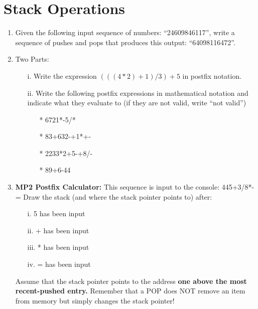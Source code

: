 \documentclass{article}
\begin{document}
\section{Stack Operations}
\begin{enumerate}[label=(\alph*)]
    \item Given the following input sequence of numbers: “24609846117”, write a sequence of pushes and pops that produces this output: “64098116472”.

    \item Two Parts:
    \begin{enumerate}[label=()]
        \item[i.] Write the expression    $(  ( (4 * 2) + 1 ) / 3) + 5$ in postfix notation.
        \item[ii.] Write the following postfix expressions in mathematical notation and indicate what they evaluate to (if they are not valid, write “not valid”)
        \begin{enumerate}
            \item[*] 6721*-5/* \newline
            \item[*] 83+632-+1*+- \newline
            \item[*] 2233*2+5-+8/- \newline
            \item[*] 89+6-44 \newline
        \end{enumerate}
    \end{enumerate}


    \item \textbf{MP2 Postfix Calculator:} This sequence is input to the console: 445+3/8*-= Draw the stack (and where the stack pointer points to) after:

    \begin{enumerate}
        \item[i.] 5 has been input
        \item[ii.] + has been input
        \item[iii.] * has been input
        \item[iv.] = has been input
    \end{enumerate}
    Assume that the stack pointer points to the address \textbf{one above the most recent-pushed entry.} Remember that a POP does NOT remove an item from memory but simply changes the stack pointer!
    \newpage
 
\end{enumerate}
\end{document}
